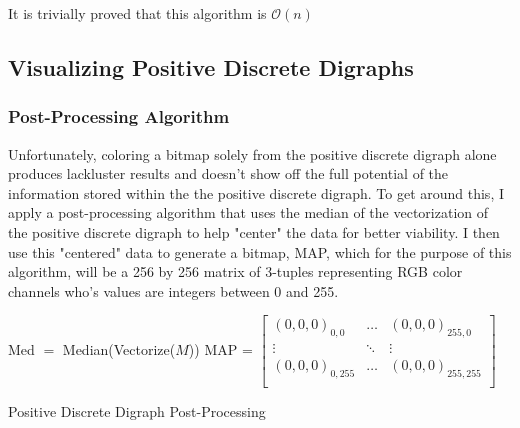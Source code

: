 \documentclass[12pt,a4paper]{article}
\begin{document}
It is trivially proved that this algorithm is $\mathcal{O}(n)$ 
\subsection{Visualizing Positive Discrete Digraphs}
\subsubsection{Post-Processing Algorithm}
Unfortunately, coloring a bitmap solely from the positive discrete digraph alone produces lackluster results and doesn't show off the full potential of the information stored within the the positive discrete digraph. To get around this, I apply a post-processing algorithm that uses the median of the vectorization of the positive discrete digraph to help "center" the data for better viability. I then use this "centered" data to generate a bitmap, MAP, which for the purpose of this algorithm, will be a 256 by 256 matrix of 3-tuples representing RGB color channels who's values are integers between 0 and 255. 

\begin{algorithm}
\DontPrintSemicolon
{}
\BlankLine
Med $=$ Median(Vectorize($M$))\;
MAP = $\begin{bmatrix}(0,0,0)_{0,0} & \ldots & (0,0,0)_{255,0}\\\vdots &\ddots&\vdots\\(0,0,0)_{0,255} & \ldots & (0,0,0)_{255,255}\\\end{bmatrix}$\;
\caption{Positive Discrete Digraph Post-Processing}
\end{algorithm}
\end{document}

